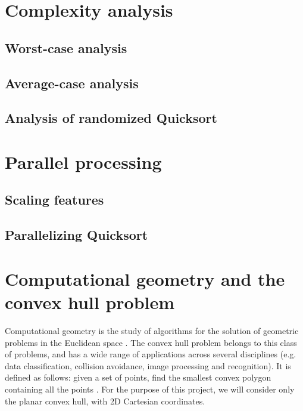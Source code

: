 \documentclass[]{finalproject}
\begin{document}
 


\section{Complexity analysis}
\subsection{Worst-case analysis}
\subsection{Average-case analysis}
\subsection{Analysis of randomized Quicksort}

\section{Parallel processing}
\subsection{Scaling features}
\subsection{Parallelizing Quicksort}

\section{Computational geometry and the convex hull problem}
Computational geometry is the study of algorithms for the solution of geometric problems in the Euclidean space \cite{paper}.
The convex hull problem belongs to this class of problems, and has a wide range of applications across several disciplines
(e.g. data classification, collision avoidance, image processing and recognition). It is defined as follows:
given a set of points, find the smallest convex polygon containing all the points \cite{geowiki}.
For the purpose of this project, we will consider only the planar convex hull, with 2D Cartesian coordinates.
\end{document}
